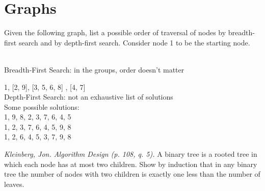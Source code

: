 \documentclass[solutionorbox,answers]{exam}
\begin{document}
\begin{questions}
\begin{parts}
\end{parts}


\pagebreak
\section*{Graphs}

\question Given the following graph, list a possible order of traversal of nodes by breadth-first search and by depth-first search. Consider node 1 to be the starting node.

\begin{minipage}{0.3\linewidth}
\end{minipage}
\qquad
\begin{minipage}{0.6\linewidth}
\begin{solutionbox}{1.7in}    \vspace{1em}                                                            \\
  Breadth-First Search: in the groups, order doesn't matter

   1, [2, 9], [3, 5, 6, 8] , [4, 7]   \\

  Depth-First Search: not an exhaustive list of solutions \\
  Some possible solutions: \\
   1, 9, 8, 2, 3, 7, 6, 4, 5 \\
   1, 2, 3, 7, 6, 4, 5, 9, 8 \\
   1, 2, 6, 4, 5, 3, 7, 9, 8
\end{solutionbox}
\end{minipage}

\question \textit{Kleinberg, Jon. Algorithm Design (p. 108, q. 5).} A binary tree is a rooted tree in which each node has at most two children. Show by induction that in any binary tree the number of nodes with two children is exactly one less than the number of leaves. 

\nopagebreak


\end{questions}
\end{document}
